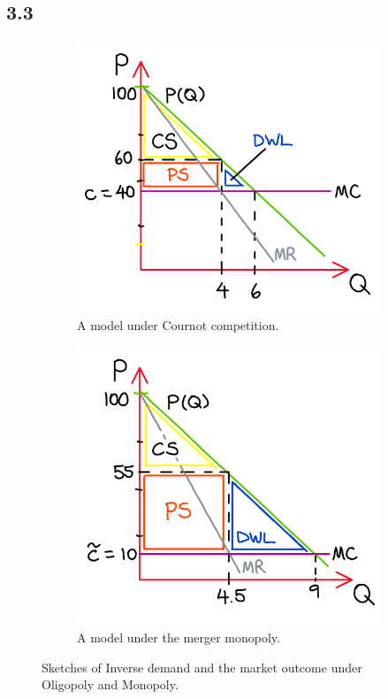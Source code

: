 \documentclass{article}
\begin{document}
\subsection*{3.3}
\begin{figure}[H]
    \centering
    \begin{subfigure}[b]{0.4\linewidth}
      \includegraphics[width=\linewidth]{3-3i.png}
      \caption{A model under Cournot competition.}
    \end{subfigure}
    \begin{subfigure}[b]{0.4\linewidth}
      \includegraphics[width=\linewidth]{3-3ii.png}
      \caption{A model under the merger monopoly.}
    \end{subfigure}
    \caption{Sketches of Inverse demand and the market outcome under Oligopoly and Monopoly.}
    \label{fig:Q3.3}
\end{figure}
\end{document}
